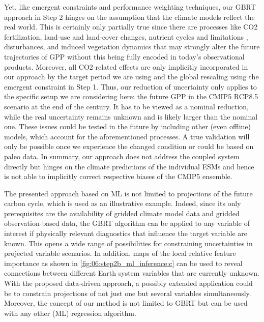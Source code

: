 Yet, like emergent constraints and performance weighting techniques, our
\ac{GBRT} approach in Step 2 hinges on the assumption that the climate models
reflect the real world. This is certainly only partially true since there are
processes like \ac{CO2} fertilization, land-use and land-cover changes,
nutrient cycles and limitations \autocite{Du2020,Fleischer2019}, disturbances,
and induced vegetation dynamics that may strongly alter the future trajectories
of \ac{GPP} without this being fully encoded in today's observational products.
Moreover, all \acs{CO2}-related effects are only implicitly incorporated in our
approach by the target period we are using and the global rescaling using the
emergent constraint in Step 1. Thus, our reduction of uncertainty only applies
to the specific setup we are considering here: the future \ac{GPP} in the
\acs{CMIP}5 \acs{RCP}8.5 scenario at the end of the  century. It has to
be viewed as a nominal reduction, while the real uncertainty remains unknown
and is likely larger than the nominal one. These issues could be tested in the
future by including other (even offline) models, which account for the
aforementioned processes. A true validation will only be possible once we
experience the changed condition or could be based on paleo data. In summary,
our approach does not address the coupled system directly but hinges on the
climate predictions of the individual \acp{ESM} and hence is not able to
implicitly correct respective biases of the \acs{CMIP}5 ensemble.

The presented approach based on \ac{ML} is not limited to projections of the
future carbon cycle, which is used as an illustrative example. Indeed, since
its only prerequisites are the availability of gridded climate model data and
gridded observation-based data, the \ac{GBRT} algorithm can be applied to any
variable of interest if physically relevant diagnostics that influence the
target variable are known. This opens a wide range of possibilities for
constraining uncertainties in projected variable scenarios. In addition, maps
of the local relative feature importance as shown in
\cref{fig:06:step2b_ml_inference:c} can be used to reveal connections between
different Earth system variables that are currently unknown. With the proposed
data-driven approach, a possibly extended application could be to constrain
projections of not just one but several variables simultaneously. Moreover, the
concept of our method is not limited to \ac{GBRT} but can be used with any
other (\ac{ML}) regression algorithm.
